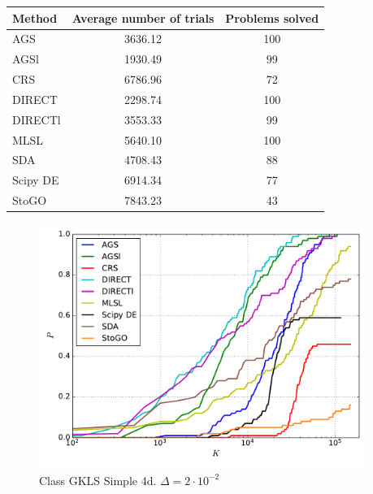 \documentclass[a4paper]{article}
\begin{document}
\begin{tabular}{lcc}
\hline
 Method   &  Average number of trials  &  Problems solved  \\
\hline
 AGS      &          3636.12           &        100        \\
 AGSl     &          1930.49           &        99         \\
 CRS      &          6786.96           &        72         \\
 DIRECT   &          2298.74           &        100        \\
 DIRECTl  &          3553.33           &        99         \\
 MLSL     &          5640.10           &        100        \\
 SDA      &          4708.43           &        88         \\
 Scipy DE &          6914.34           &        77         \\
 StoGO    &          7843.23           &        43         \\
\hline
\end{tabular}
\begin{figure}[H]
  \center
  \includegraphics[width=0.95\textwidth]{../experiments/gklss4d/cmc.pdf}
  \caption{Class GKLS Simple 4d. $\Delta=2\cdot10^{-2}$}
\end{figure}
\end{document}
